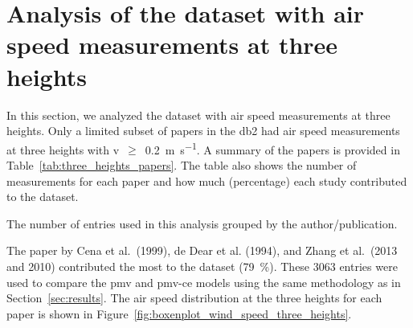 \appendix

\section{Analysis of the dataset with air speed measurements at three heights}\label{sec:analysis-of-the-dataset-with-air-speed-measurements-at-three-heights}

In this section, we analyzed the dataset with air speed measurements at three heights.
Only a limited subset of papers in the \ac{db2} had air speed measurements at three heights with \ac{v}~$\geq$~\qty{0.2}{\m\per\s}.
A summary of the papers is provided in Table~\ref{tab:three_heights_papers}.
The table also shows the number of measurements for each paper and how much (percentage) each study contributed to the dataset.
\begin{table}[htb!]
    \centering
    
    \caption{The number of entries used in this analysis grouped by the author/publication.}
    \label{tab:three_heights_papers}
\end{table}
The paper by Cena et al.\ (1999), de Dear et al. (1994), and Zhang et al.\ (2013 and 2010) contributed the most to the dataset (\qty{79}{\percent}).
These \num{3063} entries were used to compare the \ac{pmv} and \ac{pmv-ce} models using the same methodology as in Section~\ref{sec:results}.
The air speed distribution at the three heights for each paper is shown in Figure~\ref{fig:boxenplot_wind_speed_three_heights}.
